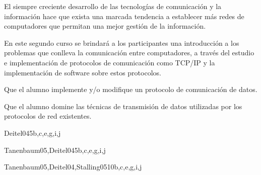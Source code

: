 \begin{syllabus}


\begin{justification}
El siempre creciente desarrollo de las tecnologías de comunicación y la
información hace que exista una marcada tendencia a  establecer
más redes de computadores que permitan una mejor
gestión de la información.

En este segundo curso se brindará a los participantes una introducción a los
problemas que conlleva la comunicación entre computadores, a través del
estudio e implementación de protocolos de comunicación como TCP/IP y
la implementación de software sobre estos protocolos.
\end{justification}

\begin{goals}
\item Que el alumno implemente y/o modifique un protocolo de comunicación de datos.
\item Que el alumno domine las técnicas de transmisión de datos utilizadas por los protocolos de red existentes.
\end{goals}

\begin{outcomes}
\end{outcomes}

\begin{unit}{\PFEventDrivenProgrammingDef}{Deitel04}{5}{b,c,e,g,i,j}
   \PFEventDrivenProgrammingAllTopics
   \begin{unitgoals}
      \item \PFEventDrivenProgrammingObjTWO
      \item \PFEventDrivenProgrammingObjTHREE
   \end{unitgoals}
\end{unit}

\begin{unit}{\NCNetworkSecurityDef}{Tanenbaum05,Deitel04}{5}{b,c,e,g,i,j}
        \NCNetworkSecurityAllTopics
        \NCNetworkSecurityAllObjectives
\end{unit}

\begin{unit}{\NCWebOrganizationDef}{Tanenbaum05,Deitel04,Stalling05}{10}{b,c,e,g,i,j}
        \NCWebOrganizationAllTopics
        \NCWebOrganizationAllObjectives
\end{unit}


\end{syllabus}
